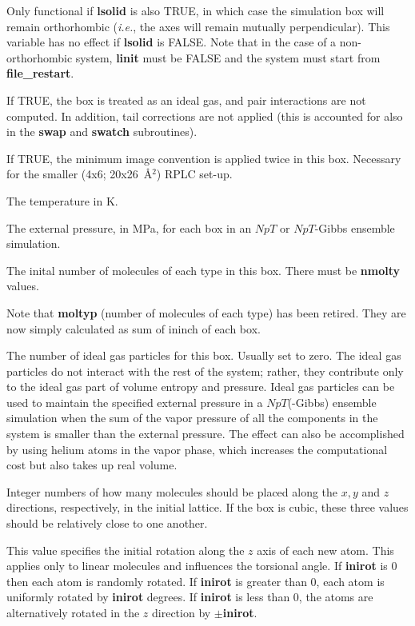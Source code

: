 \documentclass[12pt,letterpaper]{article}
\begin{document}
 Only functional if {\bf lsolid} is
also TRUE, in which case the simulation box will remain
orthorhombic (\textit{i.e.}, the axes will remain mutually
perpendicular). This variable has no effect if {\bf lsolid}
is FALSE. Note that in the case of a non-orthorhombic
system, {\bf linit} must be FALSE and the system must start
from {\bf file\_restart}.

 If TRUE, the box is treated as an
ideal gas, and pair interactions are not computed. In
addition, tail corrections are not applied (this is
accounted for also in the {\bf swap} and {\bf swatch}
subroutines).

 If TRUE, the minimum image convention
is applied twice in this box. Necessary for the smaller
(4x6; 20x26~\AA$^2$) RPLC set-up.

 The temperature in K.

 The external pressure, in MPa, for
each box in an $NpT$ or $NpT$-Gibbs ensemble simulation.

 The inital number of molecules of each
type in this box. There must be {\bf nmolty} values.

Note that {\bf moltyp} (number of molecules of each type)
has been retired. They are now simply calculated as sum of
ininch of each box.

 The number of ideal gas
particles for this box. Usually set to zero. The ideal gas
particles do not interact with the rest of the system;
rather, they contribute only to the ideal gas part of volume
entropy and pressure. Ideal gas particles can be used to
maintain the specified external pressure in a $NpT$(-Gibbs)
ensemble simulation when the sum of the vapor pressure of
all the components in the system is smaller than the
external pressure. The effect can also be accomplished by
using helium atoms in the vapor phase, which increases the
computational cost but also takes up real volume.

 Integer numbers of how many
molecules should be placed along the $x, y$ and $z$
directions, respectively, in the initial lattice. If the box
is cubic, these three values should be relatively close to
one another.

 This value specifies the initial
rotation along the $z$ axis of each new atom. This applies
only to linear molecules and influences the torsional angle.
If {\bf inirot} is 0 then each atom is randomly rotated. If
{\bf inirot} is greater than 0, each atom is uniformly
rotated by {\bf inirot} degrees. If {\bf inirot} is less
than 0, the atoms are alternatively rotated in the $z$
direction by $\pm$\textbf{inirot}.
\end{document}
